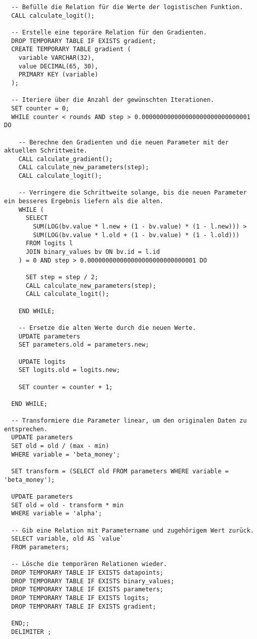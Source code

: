 \begin{verbatim}
  -- Befülle die Relation für die Werte der logistischen Funktion.
  CALL calculate_logit();

  -- Erstelle eine teporäre Relation für den Gradienten.
  DROP TEMPORARY TABLE IF EXISTS gradient;
  CREATE TEMPORARY TABLE gradient (
    variable VARCHAR(32),
    value DECIMAL(65, 30),
    PRIMARY KEY (variable)
  );

  -- Iteriere über die Anzahl der gewünschten Iterationen.
  SET counter = 0;
  WHILE counter < rounds AND step > 0.000000000000000000000000000001 DO

    -- Berechne den Gradienten und die neuen Parameter mit der aktuellen Schrittweite.
    CALL calculate_gradient();
    CALL calculate_new_parameters(step);
    CALL calculate_logit();

    -- Verringere die Schrittweite solange, bis die neuen Parameter ein besseres Ergebnis liefern als die alten.
    WHILE (
      SELECT
        SUM(LOG(bv.value * l.new + (1 - bv.value) * (1 - l.new))) >
        SUM(LOG(bv.value * l.old + (1 - bv.value) * (1 - l.old)))
      FROM logits l
      JOIN binary_values bv ON bv.id = l.id
    ) = 0 AND step > 0.000000000000000000000000000001 DO

      SET step = step / 2;
      CALL calculate_new_parameters(step);
      CALL calculate_logit();

    END WHILE;

    -- Ersetze die alten Werte durch die neuen Werte.
    UPDATE parameters
    SET parameters.old = parameters.new;

    UPDATE logits
    SET logits.old = logits.new;

    SET counter = counter + 1;

  END WHILE;

  -- Transformiere die Parameter linear, um den originalen Daten zu entsprechen.
  UPDATE parameters
  SET old = old / (max - min)
  WHERE variable = 'beta_money';

  SET transform = (SELECT old FROM parameters WHERE variable = 'beta_money');

  UPDATE parameters
  SET old = old - transform * min
  WHERE variable = 'alpha';

  -- Gib eine Relation mit Parametername und zugehörigem Wert zurück.
  SELECT variable, old AS `value`
  FROM parameters;

  -- Lösche die temporären Relationen wieder.
  DROP TEMPORARY TABLE IF EXISTS datapoints;
  DROP TEMPORARY TABLE IF EXISTS binary_values;
  DROP TEMPORARY TABLE IF EXISTS parameters;
  DROP TEMPORARY TABLE IF EXISTS logits;
  DROP TEMPORARY TABLE IF EXISTS gradient;

  END;;
  DELIMITER ;
\end{verbatim}

